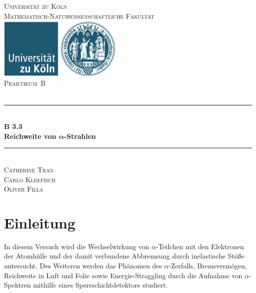 \documentclass[12pt,a4paper]{scrartcl}
\numberwithin{equation}{section} %
\newcommand{\HRule}{\rule{\linewidth}{0.7mm}}
\begin{document}
\begin{titlepage}
	\pagestyle{empty}

	\begin{center}

	\textsc{\LARGE Universität zu Köln }\\ [0.4cm]
	\textsc{Mathematisch-Naturwissenschaftliche Fakultät} \\[1.5cm]

	\includegraphics[width=0.45\textwidth]{../media/uni.jpg}\\[1.5cm]  %

	\textsc{\Large Praktikum~B}\\[2mm]
	\textsc{}\\[10mm]
	\HRule \\[0.4cm]

		{	\Huge \bfseries B 3.3}\\[0.4cm]
			{	\huge \bfseries Reichweite von $\pmb{\alpha}$-Strahlen}\\[0.3cm]
	
	\HRule \\[3cm]

		\textsc{\Large Catherine Tran } \\[3pt]
		\textsc{\Large Carlo Kleefisch } \\[3pt]
		\textsc{\Large Oliver Filla } \\[3pt]
		

	\end{center}
\end{titlepage}

\newpage
\tableofcontents
\newpage

\hypertarget{einleitung}{%
\section{Einleitung}\label{einleitung}}

In diesem Versuch wird die Wechselwirkung von $\alpha$-Teilchen mit den Elektronen der Atomhülle und der damit verbundene Abbremsung durch inelastische Stöße untersucht. Des Weiteren werden das Phänomen des $\alpha$-Zerfalls, Bremsvermögen, Reichweite in Luft und Folie sowie Energie-Straggling durch die Aufnahme von $\alpha$-Spektren mithilfe eines Sperrschichtdetektors studiert.
\end{document}
